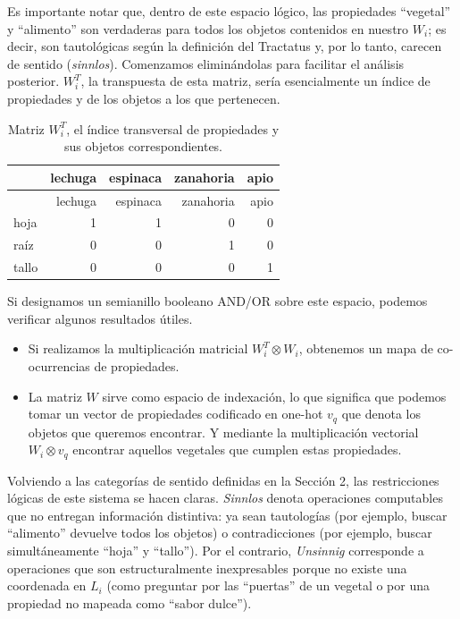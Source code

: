 \documentclass{article}
\providecommand{\tightlist}{%
  \setlength{\itemsep}{0pt}\setlength{\parskip}{0pt}}
\begin{document}
Es importante notar que, dentro de este espacio lógico, las propiedades
``vegetal'' y ``alimento'' son verdaderas para todos los objetos
contenidos en nuestro \(W_i\); es decir, son tautológicas según la
definición del Tractatus y, por lo tanto, carecen de sentido
(\emph{sinnlos}). Comenzamos eliminándolas para facilitar el análisis
posterior. \(W^{T}_i\), la transpuesta de esta matriz, sería
esencialmente un índice de propiedades y de los objetos a los que
pertenecen.

\begin{longtable}[]{@{}lrrrr@{}}
\caption{Matriz \(W^{T}_i\), el índice transversal de propiedades y sus
objetos correspondientes.}\tabularnewline
\toprule
& lechuga & espinaca & zanahoria & apio \\
\midrule
\endfirsthead
\toprule
& lechuga & espinaca & zanahoria & apio \\
\midrule
\endhead
hoja & 1 & 1 & 0 & 0 \\
raíz & 0 & 0 & 1 & 0 \\
tallo & 0 & 0 & 0 & 1 \\
\bottomrule
\end{longtable}

Si designamos un semianillo booleano AND/OR sobre este espacio, podemos
verificar algunos resultados útiles.

\begin{itemize}
\tightlist
\item
  Si realizamos la multiplicación matricial \(W^T_i \otimes W_i\),
  obtenemos un mapa de co-ocurrencias de propiedades.
\item
  La matriz \(W\) sirve como espacio de indexación, lo que significa que
  podemos tomar un vector de propiedades codificado en one-hot \(v_q\)
  que denota los objetos que queremos encontrar. Y mediante la
  multiplicación vectorial \(W_i \otimes v_q\) encontrar aquellos
  vegetales que cumplen estas propiedades.
\end{itemize}

Volviendo a las categorías de sentido definidas en la Sección 2, las
restricciones lógicas de este sistema se hacen claras. \emph{Sinnlos}
denota operaciones computables que no entregan información distintiva:
ya sean tautologías (por ejemplo, buscar ``alimento'' devuelve todos los
objetos) o contradicciones (por ejemplo, buscar simultáneamente ``hoja''
y ``tallo''). Por el contrario, \emph{Unsinnig} corresponde a
operaciones que son estructuralmente inexpresables porque no existe una
coordenada en \(L_i\) (como preguntar por las ``puertas'' de un vegetal
o por una propiedad no mapeada como ``sabor dulce'').
\end{document}
